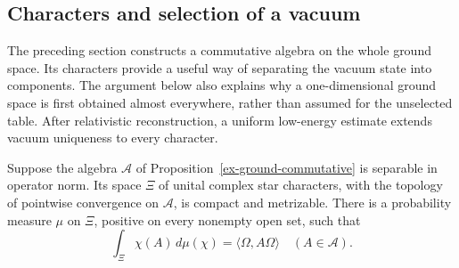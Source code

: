\subsection{Characters and selection of a vacuum}
\label{ex-phase-selection}

The preceding section constructs a commutative algebra on the whole ground
space. Its characters provide a useful way of separating the vacuum state
into components. The argument below also explains why a one-dimensional
ground space is first obtained almost everywhere, rather than assumed
for the unselected table. After relativistic reconstruction, a uniform
low-energy estimate extends vacuum uniqueness to every character.

\begin{proposition}\label{ex-character-measure}
Suppose the algebra \(\mathcal A\) of
Proposition~\ref{ex-ground-commutative} is separable in operator norm.
Its space \(\Xi\) of unital complex star characters, with the topology
of pointwise convergence on \(\mathcal A\), is compact and metrizable.
There is a probability measure \(\mu\) on \(\Xi\), positive on every
nonempty open set, such that
\begin{equation}\label{ex-spectral-state}
 \int_\Xi\chi(A)\,d\mu(\chi)=\langle\Omega,A\Omega\rangle
 \quad(A\in\mathcal A).
\end{equation}
\end{proposition}
